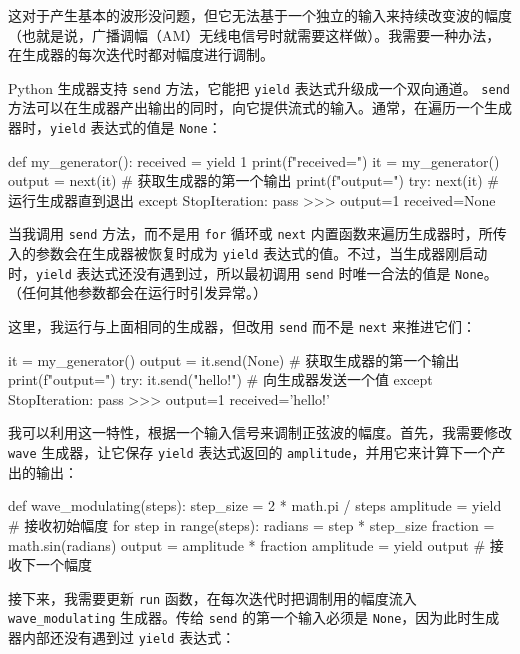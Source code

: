 这对于产生基本的波形没问题，但它无法基于一个独立的输入来持续改变波的幅度（也就是说，广播调幅（AM）无线电信号时就需要这样做）。我需要一种办法，在生成器的每次迭代时都对幅度进行调制。

Python 生成器支持 \texttt{send} 方法，它能把 \texttt{yield} 表达式升级成一个双向通道。 \texttt{send} 方法可以在生成器产出输出的同时，向它提供流式的输入。通常，在遍历一个生成器时，\texttt{yield} 表达式的值是 \texttt{None}：

\begin{codebox}[python]
def my_generator():
    received = yield 1
    print(f"{received=}")
it = my_generator()
output = next(it)  # 获取生成器的第一个输出
print(f"{output=}")
try:
    next(it)       # 运行生成器直到退出
except StopIteration:
    pass
>>>
output=1
received=None
\end{codebox}

当我调用 \texttt{send} 方法，而不是用 \texttt{for} 循环或 \texttt{next} 内置函数来遍历生成器时，所传入的参数会在生成器被恢复时成为 \texttt{yield} 表达式的值。不过，当生成器刚启动时，\texttt{yield} 表达式还没有遇到过，所以最初调用 \texttt{send} 时唯一合法的值是 \texttt{None}。（任何其他参数都会在运行时引发异常。）

这里，我运行与上面相同的生成器，但改用 \texttt{send} 而不是 \texttt{next} 来推进它们：

\begin{codebox}[python]
it = my_generator()
output = it.send(None)  # 获取生成器的第一个输出
print(f"{output=}")
try:
    it.send("hello!")   # 向生成器发送一个值
except StopIteration:
    pass
>>>
output=1
received='hello!'
\end{codebox}

我可以利用这一特性，根据一个输入信号来调制正弦波的幅度。首先，我需要修改 \texttt{wave} 生成器，让它保存 \texttt{yield} 表达式返回的 \texttt{amplitude}，并用它来计算下一个产出的输出：

\begin{codebox}[python]
def wave_modulating(steps):
    step_size = 2 * math.pi / steps
    amplitude = yield              # 接收初始幅度
    for step in range(steps):
        radians = step * step_size
        fraction = math.sin(radians)
        output = amplitude * fraction
        amplitude = yield output   # 接收下一个幅度
\end{codebox}

接下来，我需要更新 \texttt{run} 函数，在每次迭代时把调制用的幅度流入 \texttt{wave\_modulating} 生成器。传给 \texttt{send} 的第一个输入必须是 \texttt{None}，因为此时生成器内部还没有遇到过 \texttt{yield} 表达式：

